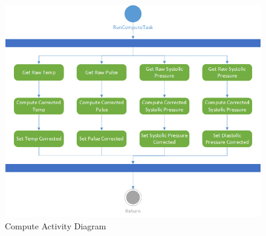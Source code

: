 \documentclass[12pt]{article} %
\begin{document}
\begin{figure}
    \centering
    \includegraphics[width=\textwidth]{design/compute_activity.png}
    \caption{Compute Activity Diagram}
    \label{fig:compute}
\end{figure}
\end{document}
